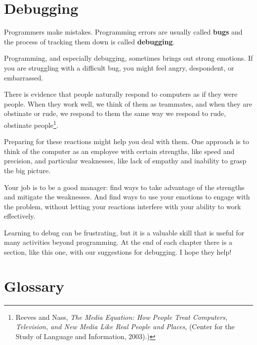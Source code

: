 \section{Debugging}

Programmers make mistakes.  Programming errors are usually 
called {\bf bugs} and the process of tracking them down is called
{\bf debugging}.

Programming, and especially debugging, sometimes brings out strong
emotions.  If you are struggling with a difficult bug, you might 
feel angry, despondent, or embarrassed.

There is evidence that people naturally respond to computers as if
they were people.  When they work well, we think
of them as teammates, and when they are obstinate or rude, we
respond to them the same way we respond to rude,
obstinate people\footnote{Reeves and Nass, {\it The Media
    Equation: How People Treat Computers, Television, and New Media
    Like Real People and Places}, (Center for the Study of Language and Information, 2003).)}.

Preparing for these reactions might help you deal with them.
One approach is to think of the computer as an employee with
certain strengths, like speed and precision, and
particular weaknesses, like lack of empathy and inability
to grasp the big picture.

Your job is to be a good manager: find ways to take advantage
of the strengths and mitigate the weaknesses.  And find ways
to use your emotions to engage with the problem,
without letting your reactions interfere with your ability
to work effectively.

Learning to debug can be frustrating, but it is a valuable skill
that is useful for many activities beyond programming.  At the
end of each chapter there is a section, like this one,
with our suggestions for debugging.  I hope they help!


\section{Glossary}

